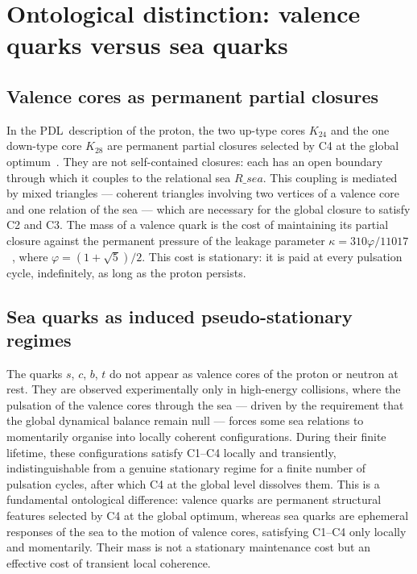 \documentclass[12pt,a4paper]{article}
\def\PDL{PDL}
\def\Rsea{R\_sea}
\theoremstyle{plain}
\theoremstyle{definition}
\theoremstyle{remark}
\newcommand{\PDL}{\textnormal{PDL}}
\newcommand{\Rsea}{R_{\mathrm{sea}}}
\begin{document}
\section{Ontological distinction: valence quarks versus sea quarks}
\label{sec:distinction}

\subsection{Valence cores as permanent partial closures}
\label{subsec:valence}

In the \PDL\ description of the proton, the two up-type cores $K_{24}$ and the one down-type core $K_{28}$ are permanent partial closures selected by C4 at the global optimum~\cite{D16a,D16b}. They are not self-contained closures: each has an open boundary through which it couples to the relational sea $\Rsea$. This coupling is mediated by mixed triangles --- coherent triangles involving two vertices of a valence core and one relation of the sea --- which are necessary for the global closure to satisfy C2 and C3. The mass of a valence quark is the cost of maintaining its partial closure against the permanent pressure of the leakage parameter $\kappa = 310\varphi/11017$~\cite{D42}, where $\varphi = (1+\sqrt{5})/2$. This cost is stationary: it is paid at every pulsation cycle, indefinitely, as long as the proton persists.

\subsection{Sea quarks as induced pseudo-stationary regimes}
\label{subsec:sea}

The quarks $s$, $c$, $b$, $t$ do not appear as valence cores of the proton or neutron at rest. They are observed experimentally only in high-energy collisions, where the pulsation of the valence cores through the sea --- driven by the requirement that the global dynamical balance remain null --- forces some sea relations to momentarily organise into locally coherent configurations. During their finite lifetime, these configurations satisfy C1--C4 locally and transiently, indistinguishable from a genuine stationary regime for a finite number of pulsation cycles, after which C4 at the global level dissolves them. This is a fundamental ontological difference: valence quarks are permanent structural features selected by C4 at the global optimum, whereas sea quarks are ephemeral responses of the sea to the motion of valence cores, satisfying C1--C4 only locally and momentarily. Their mass is not a stationary maintenance cost but an effective cost of transient local coherence.
\end{document}
